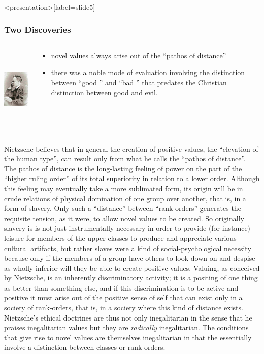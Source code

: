 \begin{frame}<presentation>[label=slide5]
    \frametitle{Two Discoveries}
        \begin{columns}
            \begin{column}{3cm}
                \includegraphics[height=4cm]{../../../graphics/nietzsche.jpg}
            \end{column}
            \begin{column}{7cm}
                \begin{itemize}
                    \item novel values always arise out of the ``pathos of distance'' 
                    \item there was a noble mode of evaluation involving the distinction between ``good '' and  ``bad '' that predates the Christian distinction between good and evil.
                \end{itemize}
            \end{column}
        \end{columns}
\end{frame}

Nietzsche believes that in general the creation of positive values, the  ``elevation of the human type'', can result only from what he calls the  ``pathos of distance''. The pathos of distance is the long-lasting feeling of power on the part of the  ``higher ruling order'' of its total superiority in relation to a lower order. Although this feeling may eventually take a more sublimated form, its origin will be in crude relations of physical domination of one group over another, that is, in a form of slavery. Only such a  ``distance'' between  ``rank orders'' generates the requisite tension, as it were, to allow novel values to be created. So originally slavery is is not just instrumentally necessary in order to provide (for instance) leisure for members of the upper classes to produce and appreciate various cultural artifacts, but rather slaves were a kind of social-psychological necessity because only if the members of a group have others to look down on and despise as wholly inferior will they be able to create positive values. Valuing, as conceived by Nietzsche, is an inherently discriminatory activity; it is a positing of one thing as better than something else, and if this discrimination is to be active and positive it must arise out of the positive sense of self that can exist only in a society of rank-orders, that is, in a society where this kind of distance exists. Nietzsche's ethical doctrines are thus not only inegalitarian in the sense that he praises inegalitarian values but they are \emph{radically} inegalitarian. The conditions that give rise to novel values are themselves inegalitarian in that the essentially involve a distinction between classes or rank orders.


